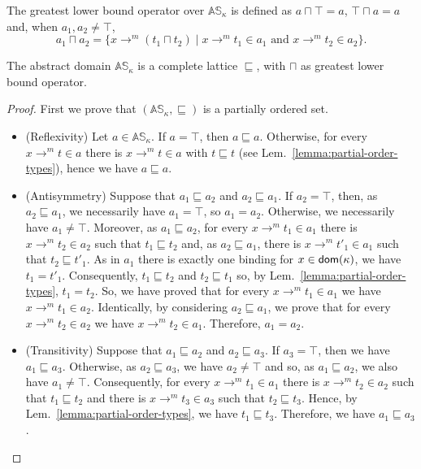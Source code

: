 \begin{definition}
  The greatest lower bound operator over $\mathbb{AS}_\kappa$ is defined as
  $a\sqcap\top=a$, $\top\sqcap a=a$ and, when $a_1,a_2\not=\top$,
  \[
  a_1\sqcap a_2=\{x\to^m(t_1\sqcap t_2)\mid x\to^m t_1\in a_1\text{ and }x\to^m t_2\in a_2\}.
  \]
\end{definition}

\begin{proposition}\label{prop:complete_lattice}
  The abstract domain $\mathbb{AS}_\kappa$ is a complete lattice \wrt $\sqsubseteq$,
  with $\sqcap$ as greatest lower bound operator.
\end{proposition}
\begin{proof}
  First we prove that $(\mathbb{AS}_\kappa,\sqsubseteq)$ is a partially
  ordered set.
  \begin{itemize}
    \item (Reflexivity) Let $a\in\mathbb{AS}_\kappa$. If $a=\top$, then
      $a\sqsubseteq a$.
      Otherwise, for every $x\to^mt\in a$ there is $x\to^mt\in a$ with
    $t\sqsubseteq t$ (see Lem.~\ref{lemma:partial-order-types}), hence we have
    $a\sqsubseteq a$.
    \item (Antisymmetry) Suppose that $a_1 \sqsubseteq a_2$ and
    $a_2 \sqsubseteq a_1$. If $a_2=\top$, then, as $a_2 \sqsubseteq a_1$,
    we necessarily have $a_1=\top$, so $a_1=a_2$. Otherwise, we necessarily
    have $a_1\neq\top$. Moreover, as $a_1 \sqsubseteq a_2$, for every
    $x\to^mt_1\in a_1$ there is $x\to^mt_2\in a_2$ such that
    $t_1\sqsubseteq t_2$ and, as $a_2 \sqsubseteq a_1$, there is
    $x\to^mt'_1\in a_1$ such that $t_2\sqsubseteq t'_1$.
    As in $a_1$ there is exactly one binding for $x\in\mathsf{dom}(\kappa)$, we have
    $t_1=t'_1$. Consequently, $t_1\sqsubseteq t_2$ and $t_2\sqsubseteq t_1$
    so, by Lem.~\ref{lemma:partial-order-types}, $t_1=t_2$. So, we have
    proved that for every $x\to^mt_1\in a_1$ we have $x\to^mt_1\in a_2$.
    Identically, by considering $a_2 \sqsubseteq a_1$, we prove that
    for every $x\to^mt_2\in a_2$ we have $x\to^mt_2\in a_1$.
    Therefore, $a_1=a_2$.
    \item (Transitivity) Suppose that $a_1 \sqsubseteq a_2$ and
    $a_2 \sqsubseteq a_3$. If $a_3=\top$, then we have $a_1\sqsubseteq a_3$.
    Otherwise, as $a_2 \sqsubseteq a_3$, we have $a_2\neq\top$ and so, as
    $a_1 \sqsubseteq a_2$, we also have $a_1\neq\top$. Consequently, for every
    $x\to^mt_1\in a_1$ there is $x\to^mt_2\in a_2$ such that
    $t_1\sqsubseteq t_2$ and there is $x\to^mt_3\in a_3$ such that
    $t_2\sqsubseteq t_3$. Hence, by Lem.~\ref{lemma:partial-order-types},
    we have $t_1\sqsubseteq t_3$. Therefore, we have $a_1\sqsubseteq a_3$.
  \end{itemize}


\end{proof}
